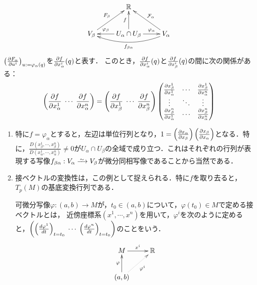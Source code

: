 \documentclass[uplatex,dvipdfmx]{jsreport}
\begin{document}
\begin{lemma}\label{lemma-patching-condition}
    \[\xymatrix{
        &\R\\
        V_\beta\ar[ur]^-{F_\beta}&U_\alpha\cap U_\beta\ar[l]_-{\varphi_\beta}\ar[r]^-{\varphi_\alpha}\ar[u]^-f&V_\alpha\ar@/^1pc/[ll]^-{f_{\beta\alpha}}\ar[ul]_-{\F_\alpha}
    }\]
    $\left(\frac{\partial F_\alpha}{\partial u^i}\right)_{u:=\varphi_\alpha(q)}$を$\frac{\partial f}{\partial x^i_\alpha}(q)$と表す．
    このとき，$\frac{\partial f}{\partial x^i_\alpha}(q)$と$\frac{\partial f}{\partial x^i_\beta}(q)$の間に次の関係がある：
    \[\left(\frac{\partial f}{\partial x^1_\alpha}\;\cdots\;\frac{\partial f}{\partial x^n_\alpha}\right)=\left(\frac{\partial f}{\partial x^1_\beta}\;\cdots\;\frac{\partial f}{\partial x^n_\beta}\right)\begin{pmatrix}\frac{\partial x^1_\beta}{\partial x^1_\alpha}&\cdots&\frac{\partial x^1_\beta}{\partial x^n_\alpha}\\\vdots&\ddots&\vdots\\\frac{\partial x^n_\beta}{\partial x^1_\alpha}&\cdots&\frac{\partial x^n_\beta}{\partial x^n_\alpha}\end{pmatrix}\]
\end{lemma}
\begin{remark}\mbox{}
    \begin{enumerate}
        \item 特に$f=\varphi_\alpha$とすると，左辺は単位行列となり，$1=\left(\frac{\partial x_\alpha}{\partial x_\beta}\right)\left(\frac{\partial x_\beta}{\partial x_\alpha}\right)$となる．特に，$\frac{D(x^1_\beta,\cdots,x^n_\beta)}{D(x^1_\alpha,\cdots,x^n_\alpha)}\ne 0$が$U_\alpha\cap U_\beta$の全域で成り立つ．これはそれぞれの行列が表現する写像$f_{\beta\alpha}:V_\alpha\iso V_\beta$が微分同相写像であることから当然である．
        \item 接ベクトルの変換性は，この例として捉えられる．特に$f$を取り去ると，$T_p(M)$の基底変換行列である．
        
        可微分写像$\varphi:(a,b)\to M$が，$t_0\in(a,b)$について，$\varphi(t_0)\in M$で定める接ベクトルとは，
        近傍座標系$(x^1,\cdots,x^n)$を用いて，$\varphi^i$を次のように定めると，$\left(\left(\frac{d \varphi^1}{d t}\right)_{t=t_0}\;\cdots\;\left(\frac{d \varphi^n}{d t}\right)_{t=t_0}\right)$のことをいう．
        \[\xymatrix{
            M\ar[r]^-{x^i}&\R\\
            (a,b)\ar[u]^-{\varphi}\ar@{.>}[ur]_-{\varphi^i}
        }\]
    \end{enumerate}
\end{remark}
\end{document}
